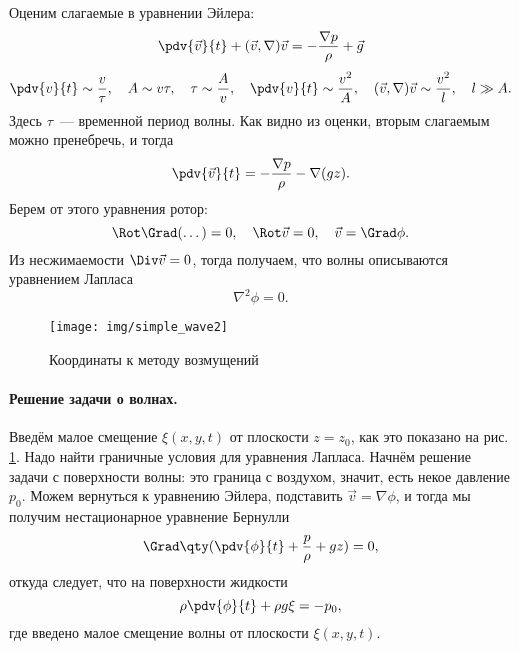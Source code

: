 \begin{comment}

       |<------ l ----->|
   ________        ___________
  /        \       /          ^
/           \ _ _ /           | a
------------------------------------------
\end{comment}
Оценим слагаемые в уравнении Эйлера:
\begin{equation}
	\label{eq:e1}
	\pdv{\vec{v}}{t}+(\vec{v},\nabla)\vec{v}=-\frac{\nabla p}{\rho}+\vec{g}
\end{equation}
\begin{equation}
	\label{eq:e2}
	\pdv{v}{t}\sim\frac{v}{\tau}, \quad
	A\sim v\tau, \quad \tau \sim \frac{A}{v},
	\quad \pdv{v}{t}\sim \frac{v^2}{A},
	\quad (\vec{v},\nabla)\vec{v}\sim \frac{v^2}{l},
	\quad l\gg A.
\end{equation}
Здесь $\tau$~--- временной период волны. Как видно из оценки, вторым слагаемым можно пренебречь, и тогда
\begin{equation}
	\label{eq:pdvvv}
	\pdv{\vec{v}}{t}=-\frac{\nabla p}{\rho}-\nabla(gz).
\end{equation}
Берем от этого уравнения ротор:
\begin{equation}
	\Rot\Grad (\dots)=0, \quad
	\Rot\vec{v}=0, \quad \vec{v}=\Grad\phi.
\end{equation}
Из несжимаемости $\Div\vec{v}=0$, тогда получаем, что волны описываются уравнением Лапласа
\begin{equation}
	\nabla^2\phi=0.
\end{equation}


\begin{figure}[H]
    \centering
    \texttt{[image: img/simple\_wave2]}
    \caption{Координаты к методу возмущений}
    \label{fig:simplewave2}
\end{figure}

\paragraph{Решение задачи о волнах.} Введём малое смещение $\xi(x,y,t)$ от плоскости $z=z_0$, как это показано на рис. \ref{fig:simplewave2}. Надо найти граничные условия для уравнения Лапласа. Начнём решение задачи с поверхности волны: это граница с воздухом, значит, есть некое давление $p_0$. Можем вернуться к уравнению Эйлера, подставить $\vec{v} = \nabla\phi$, и тогда мы получим нестационарное уравнение Бернулли
\begin{equation}
	\Grad\qty(\pdv{\phi}{t}+\frac{p}{\rho}+gz)=0,
\end{equation}
откуда следует, что на поверхности жидкости
\begin{equation}
	\rho\pdv{\phi}{t}+\rho g\xi=-p_0,
\end{equation}
где введено малое смещение волны от плоскости $\xi(x,y,t)$.


